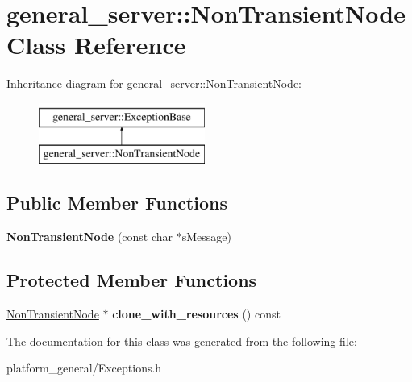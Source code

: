 \hypertarget{classgeneral__server_1_1NonTransientNode}{\section{general\-\_\-server\-:\-:\-Non\-Transient\-Node \-Class \-Reference}
\label{classgeneral__server_1_1NonTransientNode}
}
\-Inheritance diagram for general\-\_\-server\-:\-:\-Non\-Transient\-Node\-:\begin{figure}[H]
\begin{center}
\leavevmode
\includegraphics[height=2.000000cm]{classgeneral__server_1_1NonTransientNode}
\end{center}
\end{figure}
\subsection*{\-Public \-Member \-Functions}
\begin{DoxyCompactItemize}
\item 
\hypertarget{classgeneral__server_1_1NonTransientNode_a5d0b2f40c76796b530c84362fc03d5e8}{{\bfseries \-Non\-Transient\-Node} (const char $\ast$s\-Message)}\label{classgeneral__server_1_1NonTransientNode_a5d0b2f40c76796b530c84362fc03d5e8}

\end{DoxyCompactItemize}
\subsection*{\-Protected \-Member \-Functions}
\begin{DoxyCompactItemize}
\item 
\hypertarget{classgeneral__server_1_1NonTransientNode_a3922cdb607e62cad9e2360abee4f2ad9}{\hyperlink{classgeneral__server_1_1NonTransientNode}{\-Non\-Transient\-Node} $\ast$ {\bfseries clone\-\_\-with\-\_\-resources} () const }\label{classgeneral__server_1_1NonTransientNode_a3922cdb607e62cad9e2360abee4f2ad9}

\end{DoxyCompactItemize}


\-The documentation for this class was generated from the following file\-:\begin{DoxyCompactItemize}
\item 
platform\-\_\-general/\-Exceptions.\-h\end{DoxyCompactItemize}
